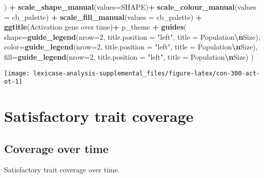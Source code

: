 \documentclass[
]{book}
\newenvironment{Shaded}{\begin{snugshade}}{\end{snugshade}}
\newcommand{\AttributeTok}[1]{\textcolor[rgb]{0.13,0.29,0.53}{#1}}
\newcommand{\DecValTok}[1]{\textcolor[rgb]{0.00,0.00,0.81}{#1}}
\newcommand{\FunctionTok}[1]{\textcolor[rgb]{0.13,0.29,0.53}{\textbf{#1}}}
\newcommand{\NormalTok}[1]{#1}
\newcommand{\SpecialCharTok}[1]{\textcolor[rgb]{0.81,0.36,0.00}{\textbf{#1}}}
\newcommand{\StringTok}[1]{\textcolor[rgb]{0.31,0.60,0.02}{#1}}
\begin{document}
\begin{Shaded}
\begin{Highlighting}[]
\NormalTok{  ) }\SpecialCharTok{+}
  \FunctionTok{scale\_shape\_manual}\NormalTok{(}\AttributeTok{values=}\NormalTok{SHAPE)}\SpecialCharTok{+}
  \FunctionTok{scale\_colour\_manual}\NormalTok{(}\AttributeTok{values =}\NormalTok{ cb\_palette) }\SpecialCharTok{+}
  \FunctionTok{scale\_fill\_manual}\NormalTok{(}\AttributeTok{values =}\NormalTok{ cb\_palette) }\SpecialCharTok{+}
  \FunctionTok{ggtitle}\NormalTok{(}\StringTok{\textquotesingle{}Activation gene over time\textquotesingle{}}\NormalTok{)}\SpecialCharTok{+}
\NormalTok{  p\_theme }\SpecialCharTok{+}
  \FunctionTok{guides}\NormalTok{(}
    \AttributeTok{shape=}\FunctionTok{guide\_legend}\NormalTok{(}\AttributeTok{nrow=}\DecValTok{2}\NormalTok{, }\AttributeTok{title.position =} \StringTok{"left"}\NormalTok{, }\AttributeTok{title =} \StringTok{\textquotesingle{}Population}\SpecialCharTok{\textbackslash{}n}\StringTok{Size\textquotesingle{}}\NormalTok{),}
    \AttributeTok{color=}\FunctionTok{guide\_legend}\NormalTok{(}\AttributeTok{nrow=}\DecValTok{2}\NormalTok{, }\AttributeTok{title.position =} \StringTok{"left"}\NormalTok{, }\AttributeTok{title =} \StringTok{\textquotesingle{}Population}\SpecialCharTok{\textbackslash{}n}\StringTok{Size\textquotesingle{}}\NormalTok{),}
    \AttributeTok{fill=}\FunctionTok{guide\_legend}\NormalTok{(}\AttributeTok{nrow=}\DecValTok{2}\NormalTok{, }\AttributeTok{title.position =} \StringTok{"left"}\NormalTok{, }\AttributeTok{title =} \StringTok{\textquotesingle{}Population}\SpecialCharTok{\textbackslash{}n}\StringTok{Size\textquotesingle{}}\NormalTok{)}
\NormalTok{  )}
\end{Highlighting}
\end{Shaded}

\texttt{[image: lexicase-analysis-supplemental\_files/figure-latex/con-300-act-ot-1]}

\hypertarget{satisfactory-trait-coverage-3}{%
\section{Satisfactory trait coverage}\label{satisfactory-trait-coverage-3}}

\hypertarget{coverage-over-time-7}{%
\subsection{Coverage over time}\label{coverage-over-time-7}}

Satisfactory trait coverage over time.
\end{document}
